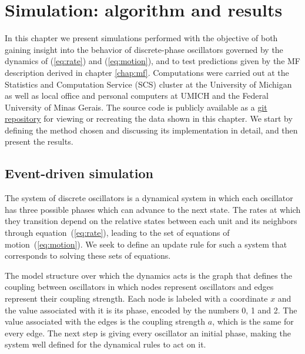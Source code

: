 \chapter{Simulation: algorithm and results}
\label{chap:simulation}

In this chapter we present simulations performed with the objective of both gaining insight into the behavior of discrete-phase
oscillators governed by the dynamics of (\ref{eq:rate}) and (\ref{eq:motion}), and to test predictions given by the  MF description
derived in chapter \ref{chap:mf}.  Computations were carried out at the Statistics and Computation Service (SCS) cluster at the
University of Michigan as well as local office and personal computers at UMICH and the Federal University of Minas Gerais. The source
code is publicly available as a \href{https://github.com/KiloLiuton/event-driven-cpp-minimalist}{git repository}\footnotemark{} for
viewing or recreating the data shown in this chapter. We start by defining the method chosen and discussing its implementation in
detail, and then present the results.


\section{Event-driven simulation}

The system of discrete oscillators is a dynamical system in which each oscillator has three possible phases which can advance to the
next state. The rates at which they transition depend on the relative states between each unit and its neighbors through
equation~(\ref{eq:rate}), leading to the set of equations of motion~(\ref{eq:motion}). We seek to define an update rule for such a
system that corresponds to solving these sets of equations.

The model structure over which the dynamics acts is the graph that defines the coupling between oscillators in which nodes
represent oscillators and edges represent their coupling strength. Each node is labeled with a coordinate $x$ and the value associated
with it is its phase, encoded by the numbers 0, 1 and 2. The value associated with the edges is the coupling strength $a$,
which is the same for every edge. The next step is giving every oscillator an initial phase, making the system well defined for the
dynamical rules to act on it.

